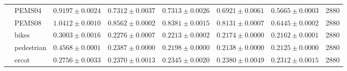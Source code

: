 \begin{table}[h]
{\begin{tabular}{llcccccc}
 & PEMS04 & $0.9197{\pm}0.0024$ & $0.7312{\pm}0.0037$ & $0.7313{\pm}0.0026$ & $0.6921{\pm}0.0061$ & $\mathbf{0.5665}{\pm}0.0003$ & 2880 \\
 & PEMS08 & $1.0412{\pm}0.0010$ & $0.8562{\pm}0.0002$ & $0.8381{\pm}0.0015$ & $0.8131{\pm}0.0007$ & $\mathbf{0.6445}{\pm}0.0002$ & 2880 \\
 & bikes & $0.3003{\pm}0.0016$ & $0.2276{\pm}0.0007$ & $0.2213{\pm}0.0002$ & $0.2174{\pm}0.0000$ & $\mathbf{0.2162}{\pm}0.0001$ & 2880 \\
 & pedestrian & $0.4568{\pm}0.0001$ & $0.2387{\pm}0.0000$ & $0.2198{\pm}0.0000$ & $0.2138{\pm}0.0000$ & $\mathbf{0.2125}{\pm}0.0000$ & 2880 \\
 & ercot & $0.2756{\pm}0.0033$ & $0.2370{\pm}0.0013$ & $0.2345{\pm}0.0020$ & $0.2380{\pm}0.0049$ & $\mathbf{0.2312}{\pm}0.0015$ & 2880 \\
\bottomrule
\end{tabular}}
\end{table}

